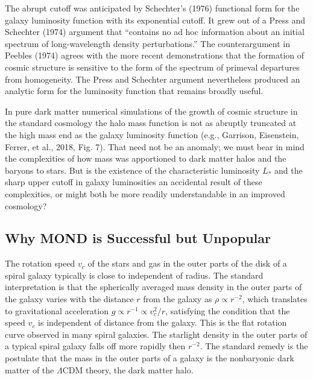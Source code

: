 \documentclass[fleqn,12pt]{article}
\begin{document}
The abrupt cutoff was anticipated by Schechter's (1976) functional form for the galaxy luminosity function with its exponential cutoff. It grew out of a Press and Schechter (1974) argument that ``contains no ad hoc information about an initial spectrum of long-wavelength density perturbations.'' The counterargument in Peebles (1974) agrees with the more recent demonstrations that the formation of cosmic structure is sensitive to the form of the spectrum of primeval departures from homogeneity. The Press and Schechter argument nevertheless produced an analytic form for the luminosity function that remains broadly useful.

In pure dark matter numerical simulations of the growth of cosmic structure in the standard cosmology the halo mass function is not as abruptly truncated at the high mass end as the galaxy luminosity function (e.g., Garrison, Eisenstein, Ferrer, et al., 2018, Fig. 7). That need not be an anomaly; we must bear in mind  the complexities of how mass was apportioned to dark matter halos and the baryons to stars. But is the existence of the characteristic luminosity $L_\ast$ and the sharp upper cutoff in galaxy luminosities an accidental result of these complexities, or might both be more readily understandable in an improved cosmology?

\subsection{Why MOND is Successful but Unpopular}\label{MOND} 

The rotation speed $v_c$ of the stars and gas in the outer parts of the disk of a spiral galaxy typically is close to independent of radius. The standard interpretation is that the spherically averaged mass density in the outer parts of the galaxy varies with the distance $r$ from the galaxy as $\rho\propto r^{-2}$, which translates to gravitational acceleration $g\propto r^{-1}\propto v_c^2/r$, satisfying the condition that the speed $v_c$ is independent of distance from the galaxy. This is the flat rotation curve observed in many spiral galaxies. The starlight density in the outer parts of a typical spiral galaxy falls off more rapidly then $r^{-2}$. The standard remedy is the postulate that the mass in the outer parts of a galaxy is the nonbaryonic dark matter of the $\Lambda$CDM theory, the dark matter halo.
\end{document}
